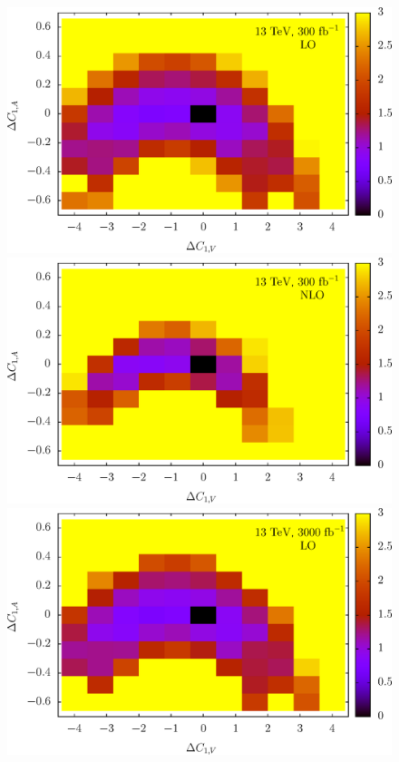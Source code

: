 \documentclass[preprint]{JHEP3} %
\begin{document}
\begin{figure}[t]
\\
\includegraphics[scale=0.5]{LHC_53_LLSign_13LO300.eps} 
\includegraphics[scale=0.5]{LHC_53_LLSign_13NLO300.eps} 
\\
\includegraphics[scale=0.5]{LHC_53_LLSign_13LO3000.eps} 

\end{figure}
\end{document}
